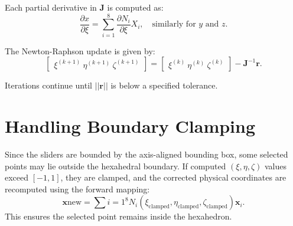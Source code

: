 \documentclass[letterpaper, 11pt]{article}
\begin{document}
	Each partial derivative in $\mathbf{J}$ is computed as:
	\begin{equation}
		\frac{\partial x}{\partial \xi} = \sum_{i=1}^{8} \frac{\partial N_i}{\partial \xi} X_i, \quad \text{similarly for } y \text{ and } z.
	\end{equation}
	
	The Newton-Raphson update is given by:
	\begin{equation}
		\begin{bmatrix} \xi^{(k+1)} \ \eta^{(k+1)} \ \zeta^{(k+1)} \end{bmatrix} = \begin{bmatrix} \xi^{(k)} \ \eta^{(k)} \ \zeta^{(k)} \end{bmatrix} - \mathbf{J}^{-1} \mathbf{r}.
	\end{equation}
	
	Iterations continue until $||\mathbf{r}||$ is below a specified tolerance.
	
	\section{Handling Boundary Clamping}
	Since the sliders are bounded by the axis-aligned bounding box, some selected points may lie outside the hexahedral boundary. If computed $(\xi, \eta, \zeta)$ values exceed $[-1,1]$, they are clamped, and the corrected physical coordinates are recomputed using the forward mapping:
	\begin{equation}
		\mathbf{x}{\text{new}} = \sum{i=1}^{8} N_i(\xi_{\text{clamped}}, \eta_{\text{clamped}}, \zeta_{\text{clamped}}) \mathbf{x}_i.
	\end{equation}
	This ensures the selected point remains inside the hexahedron.

	
	
\end{document}
